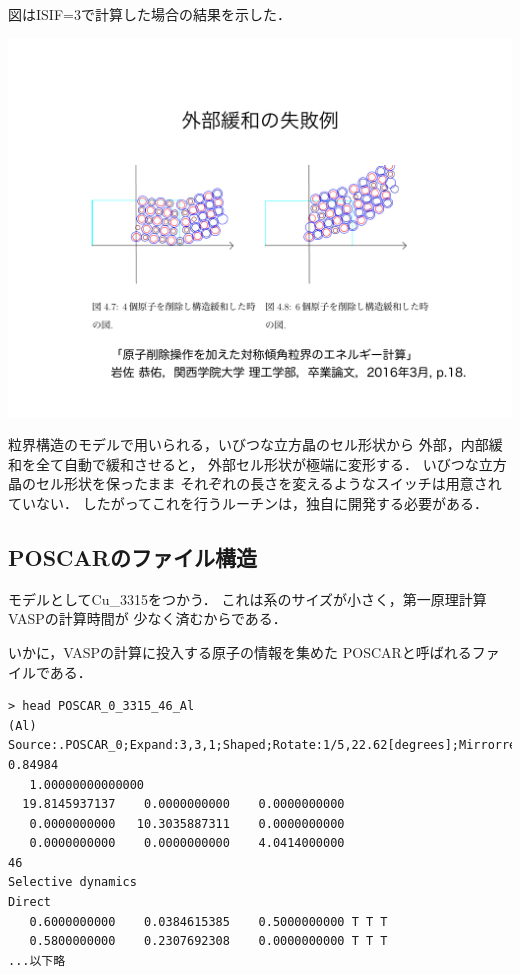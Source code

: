 図はISIF=3で計算した場合の結果を示した．
\begin{center}
\includegraphics[width=150mm]{../.././thesis/thesis.004.jpeg}
\end{center}


\label{fig:}
粒界構造のモデルで用いられる，いびつな立方晶のセル形状から
外部，内部緩和を全て自動で緩和させると， 外部セル形状が極端に変形する．
いびつな立方晶のセル形状を保ったまま
それぞれの長さを変えるようなスイッチは用意されていない．
したがってこれを行うルーチンは，独自に開発する必要がある．

    \subsection{POSCARのファイル構造}\label{poscarux306eux30d5ux30a1ux30a4ux30ebux69cbux9020}

モデルとしてCu\_3315をつかう．
これは系のサイズが小さく，第一原理計算VASPの計算時間が
少なく済むからである．

いかに，VASPの計算に投入する原子の情報を集めた
POSCARと呼ばれるファイルである．

\begin{verbatim}
> head POSCAR_0_3315_46_Al
(Al) Source:.POSCAR_0;Expand:3,3,1;Shaped;Rotate:1/5,22.62[degrees];Mirrorred;Shaped2;Cut:0.81715-0.84984
   1.00000000000000
  19.8145937137    0.0000000000    0.0000000000
   0.0000000000   10.3035887311    0.0000000000
   0.0000000000    0.0000000000    4.0414000000
46
Selective dynamics
Direct
   0.6000000000    0.0384615385    0.5000000000 T T T
   0.5800000000    0.2307692308    0.0000000000 T T T
...以下略
\end{verbatim}

